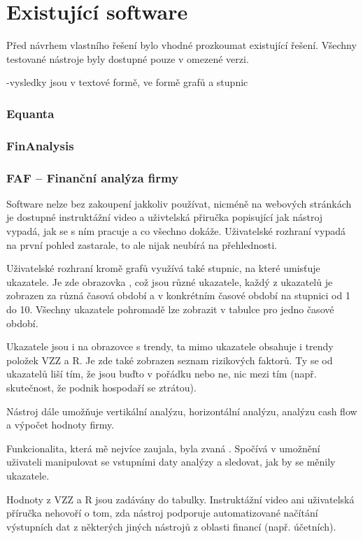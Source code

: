 \section{Existující software}
Před návrhem vlastního řešení bylo vhodné prozkoumat existující řešení. Všechny testované nástroje byly dostupné pouze v omezené verzi. 

-vysledky jsou v textové formě, ve formě grafů a stupnic

\subsubsection{Equanta}



\subsubsection{FinAnalysis}



\subsubsection{FAF -- Finanční analýza firmy}
Software nelze bez zakoupení jakkoliv používat, nicméně na webových stránkách je dostupné instruktážní video a uživtelská přiručka popisující jak nástroj vypadá, jak se s ním pracuje a co všechno dokáže. Uživatelské rozhraní vypadá na první pohled zastarale, to ale nijak neubírá na přehlednosti.

Uživatelské rozhraní kromě grafů využívá také stupnic, na které umisťuje ukazatele. Je zde obrazovka , což jsou různé ukazatele, každý z ukazatelů je zobrazen za různá časová období a v konkrétním časové období na stupnici od 1 do 10. Všechny ukazatele pohromadě lze zobrazit v tabulce pro jedno časové období.

Ukazatele jsou i na obrazovce s trendy, ta mimo ukazatele obsahuje i trendy položek VZZ a R. Je zde také zobrazen seznam rizikových faktorů. Ty se od ukazatelů liší tím, že jsou buďto v pořádku nebo ne, nic mezi tím (např. skutečnost, že podnik hospodaří se ztrátou).

Nástroj dále umožňuje vertikální analýzu, horizontální analýzu, analýzu cash flow a výpočet hodnoty firmy.

Funkcionalita, která mě nejvíce zaujala, byla zvaná . Spočívá v umožnění uživateli manipulovat se vstupními daty analýzy a sledovat, jak by se měnily ukazatele.

Hodnoty z VZZ a R jsou zadávány do tabulky. Instruktážní video ani uživatelská příručka nehovoří o tom, zda nástroj podporuje automatizované načítání výstupních dat z některých jiných nástrojů z oblasti financí (např. účetních).

